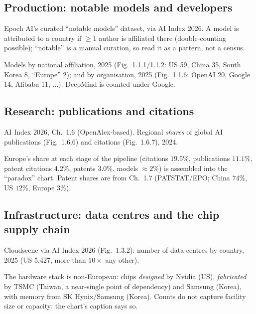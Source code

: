 \documentclass[11pt,a4paper]{article}
\begin{document}
\subsection{Production: notable models and developers}
\begin{description}[leftmargin=1.4em,style=nextline]
\item[Source] Epoch AI's curated ``notable models'' dataset, via AI Index 2026.
  A model is attributed to a country if $\ge 1$ author is affiliated there
  (double-counting possible); ``notable'' is a manual curation, so read it as a
  pattern, not a census.
\item[Series] Models by national affiliation, 2025 (Fig.~1.1.1/1.1.2: US 59,
  China 35, South Korea 8, ``Europe'' 2); and by organisation, 2025 (Fig.~1.1.6:
  OpenAI 20, Google 14, Alibaba 11, $\ldots$). DeepMind is counted under Google.
\end{description}

\subsection{Research: publications and citations}
\begin{description}[leftmargin=1.4em,style=nextline]
\item[Source] AI Index 2026, Ch.~1.6 (OpenAlex-based). Regional \emph{shares} of
  global AI publications (Fig.~1.6.6) and citations (Fig.~1.6.7), 2024.
\item[Use here] Europe's share at each stage of the pipeline (citations $19.5\%$,
  publications $11.1\%$, patent citations $4.2\%$, patents $3.0\%$, models
  $\approx 2\%$) is assembled into the ``paradox'' chart. Patent shares are from
  Ch.~1.7 (PATSTAT/EPO; China $74\%$, US $12\%$, Europe $3\%$).
\end{description}

\subsection{Infrastructure: data centres and the chip supply chain}
\begin{description}[leftmargin=1.4em,style=nextline]
\item[Source] Cloudscene via AI Index 2026 (Fig.~1.3.2): number of data centres
  by country, 2025 (US 5{,}427, more than $10\times$ any other).
\item[Ownership] The hardware stack is non-European: chips \emph{designed} by
  Nvidia (US), \emph{fabricated} by TSMC (Taiwan, a near-single point of
  dependency) and Samsung (Korea), with memory from SK Hynix/Samsung (Korea).
  Counts do not capture facility size or capacity; the chart's caption says so.
\end{description}
\end{document}
